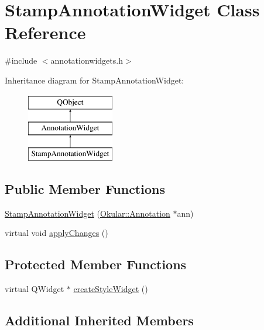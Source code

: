 \hypertarget{classStampAnnotationWidget}{\section{Stamp\+Annotation\+Widget Class Reference}
\label{classStampAnnotationWidget}
}


{\ttfamily \#include $<$annotationwidgets.\+h$>$}

Inheritance diagram for Stamp\+Annotation\+Widget\+:\begin{figure}[H]
\begin{center}
\leavevmode
\includegraphics[height=3.000000cm]{classStampAnnotationWidget}
\end{center}
\end{figure}
\subsection*{Public Member Functions}
\begin{DoxyCompactItemize}
\item 
\hyperlink{classStampAnnotationWidget_a428cf186fb4adea3fec2d9962c4e5d2e}{Stamp\+Annotation\+Widget} (\hyperlink{classOkular_1_1Annotation}{Okular\+::\+Annotation} $\ast$ann)
\item 
virtual void \hyperlink{classStampAnnotationWidget_aabddf86c8df2d97e5f3e4d1ad9ae36f5}{apply\+Changes} ()
\end{DoxyCompactItemize}
\subsection*{Protected Member Functions}
\begin{DoxyCompactItemize}
\item 
virtual Q\+Widget $\ast$ \hyperlink{classStampAnnotationWidget_ac941b293f5c4bafb413a5dd08d7d0654}{create\+Style\+Widget} ()
\end{DoxyCompactItemize}
\subsection*{Additional Inherited Members}



